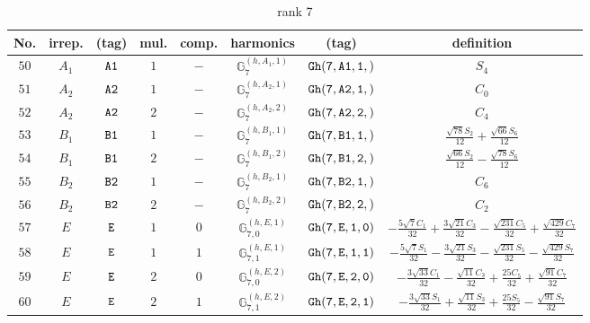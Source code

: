 \documentclass[fleqn,8pt]{jsarticle}
\begin{document}
\begin{table}[ht!]
\begin{center}
\caption{rank 7}
\renewcommand{\arraystretch}{1.3}
\begin{tabular}{cccccccc} \hline \hline
No. & irrep. & (tag) & mul. & comp. & harmonics & (tag) & definition \\ \hline
$ 50 $ & $ A_{1} $ & $ {\tt A1} $ & $ 1 $ & $ - $ & $ \mathbb{G}_{7}^{(h,A_{1},1)} $ & $ {\tt Gh(7,A1,1,)} $ & $ S_{4} $ \\
$ 51 $ & $ A_{2} $ & $ {\tt A2} $ & $ 1 $ & $ - $ & $ \mathbb{G}_{7}^{(h,A_{2},1)} $ & $ {\tt Gh(7,A2,1,)} $ & $ C_{0} $ \\
$ 52 $ & $ A_{2} $ & $ {\tt A2} $ & $ 2 $ & $ - $ & $ \mathbb{G}_{7}^{(h,A_{2},2)} $ & $ {\tt Gh(7,A2,2,)} $ & $ C_{4} $ \\
$ 53 $ & $ B_{1} $ & $ {\tt B1} $ & $ 1 $ & $ - $ & $ \mathbb{G}_{7}^{(h,B_{1},1)} $ & $ {\tt Gh(7,B1,1,)} $ & $ \frac{\sqrt{78} S_{2}}{12} + \frac{\sqrt{66} S_{6}}{12} $ \\
$ 54 $ & $ B_{1} $ & $ {\tt B1} $ & $ 2 $ & $ - $ & $ \mathbb{G}_{7}^{(h,B_{1},2)} $ & $ {\tt Gh(7,B1,2,)} $ & $ \frac{\sqrt{66} S_{2}}{12} - \frac{\sqrt{78} S_{6}}{12} $ \\
$ 55 $ & $ B_{2} $ & $ {\tt B2} $ & $ 1 $ & $ - $ & $ \mathbb{G}_{7}^{(h,B_{2},1)} $ & $ {\tt Gh(7,B2,1,)} $ & $ C_{6} $ \\
$ 56 $ & $ B_{2} $ & $ {\tt B2} $ & $ 2 $ & $ - $ & $ \mathbb{G}_{7}^{(h,B_{2},2)} $ & $ {\tt Gh(7,B2,2,)} $ & $ C_{2} $ \\
$ 57 $ & $ E $ & $ {\tt E} $ & $ 1 $ & $ 0 $ & $ \mathbb{G}_{7,0}^{(h,E,1)} $ & $ {\tt Gh(7,E,1,0)} $ & $ - \frac{5 \sqrt{7} C_{1}}{32} + \frac{3 \sqrt{21} C_{3}}{32} - \frac{\sqrt{231} C_{5}}{32} + \frac{\sqrt{429} C_{7}}{32} $ \\
$ 58 $ & $ E $ & $ {\tt E} $ & $ 1 $ & $ 1 $ & $ \mathbb{G}_{7,1}^{(h,E,1)} $ & $ {\tt Gh(7,E,1,1)} $ & $ - \frac{5 \sqrt{7} S_{1}}{32} - \frac{3 \sqrt{21} S_{3}}{32} - \frac{\sqrt{231} S_{5}}{32} - \frac{\sqrt{429} S_{7}}{32} $ \\
$ 59 $ & $ E $ & $ {\tt E} $ & $ 2 $ & $ 0 $ & $ \mathbb{G}_{7,0}^{(h,E,2)} $ & $ {\tt Gh(7,E,2,0)} $ & $ - \frac{3 \sqrt{33} C_{1}}{32} - \frac{\sqrt{11} C_{3}}{32} + \frac{25 C_{5}}{32} + \frac{\sqrt{91} C_{7}}{32} $ \\
$ 60 $ & $ E $ & $ {\tt E} $ & $ 2 $ & $ 1 $ & $ \mathbb{G}_{7,1}^{(h,E,2)} $ & $ {\tt Gh(7,E,2,1)} $ & $ - \frac{3 \sqrt{33} S_{1}}{32} + \frac{\sqrt{11} S_{3}}{32} + \frac{25 S_{5}}{32} - \frac{\sqrt{91} S_{7}}{32} $ \\

\end{tabular}
\end{center}
\end{table}
\end{document}
